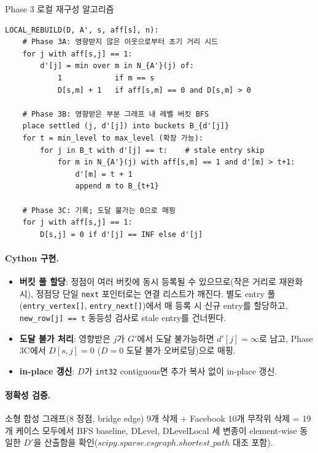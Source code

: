 \documentclass[11pt,a4paper]{article}
\begin{document}
\begin{mathbox}{Phase 3 로컬 재구성 알고리즘}
\begin{verbatim}
LOCAL_REBUILD(D, A', s, aff[s], n):
    # Phase 3A: 영향받지 않은 이웃으로부터 초기 거리 시드
    for j with aff[s,j] == 1:
        d'[j] = min over m in N_{A'}(j) of:
            1            if m == s
            D[s,m] + 1   if aff[s,m] == 0 and D[s,m] > 0

    # Phase 3B: 영향받은 부분 그래프 내 레벨 버킷 BFS
    place settled (j, d'[j]) into buckets B_{d'[j]}
    for t = min_level to max_level (확장 가능):
        for j in B_t with d'[j] == t:    # stale entry skip
            for m in N_{A'}(j) with aff[s,m] == 1 and d'[m] > t+1:
                d'[m] = t + 1
                append m to B_{t+1}

    # Phase 3C: 기록; 도달 불가는 0으로 매핑
    for j with aff[s,j] == 1:
        D[s,j] = 0 if d'[j] == INF else d'[j]
\end{verbatim}
\end{mathbox}

\paragraph{Cython 구현.}
\begin{itemize}[leftmargin=1.4em]
  \item \textbf{버킷 풀 할당}: 정점이 여러 버킷에 동시 등록될 수 있으므로(작은 거리로 재완화 시), 정점당 단일 \texttt{next} 포인터로는 연결 리스트가 깨진다. 별도 entry 풀(\texttt{entry\_vertex[]}, \texttt{entry\_next[]})에서 매 등록 시 신규 entry를 할당하고, \texttt{new\_row[j] == t} 동등성 검사로 stale entry를 건너뛴다.
  \item \textbf{도달 불가 처리}: 영향받은 $j$가 $G'$에서 도달 불가능하면 $d'[j] = \infty$로 남고, Phase 3C에서 $D[s,j] = 0$ ($D{=}0$ 도달 불가 오버로딩)으로 매핑.
  \item \textbf{in-place 갱신}: $D$가 \texttt{int32} contiguous면 추가 복사 없이 in-place 갱신.
\end{itemize}

\paragraph{정확성 검증.}
소형 합성 그래프(8 정점, bridge edge) 9개 삭제 + Facebook 10개 무작위 삭제 = 19개 케이스 모두에서 BFS baseline, DLevel, DLevelLocal 세 변종이 element-wise 동일한 $D'$을 산출함을 확인($scipy.sparse.csgraph.shortest\_path$ 대조 포함).
\end{document}
